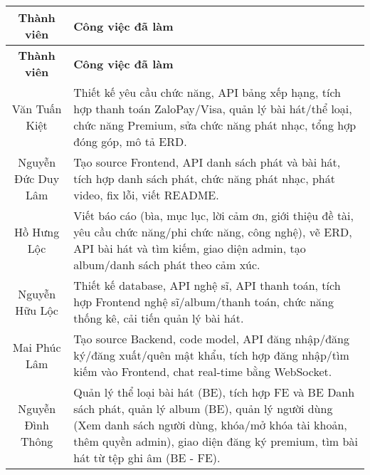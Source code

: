 \begin{longtable}{|c|p{12cm}|}
    \hline
    \textbf{Thành viên} & \textbf{Công việc đã làm} \\
    \hline
    \endfirsthead
    \hline
    \textbf{Thành viên} & \textbf{Công việc đã làm} \\
    \hline
    \endhead
    \hline
    \endfoot

    Văn Tuấn Kiệt & Thiết kế yêu cầu chức năng, API bảng xếp hạng, tích hợp thanh toán ZaloPay/Visa, quản lý bài hát/thể loại, chức năng Premium, sửa chức năng phát nhạc, tổng hợp đóng góp, mô tả ERD. \\
    \hline
    Nguyễn Đức Duy Lâm & Tạo source Frontend, API danh sách phát và bài hát, tích hợp danh sách phát, chức năng phát nhạc, phát video, fix lỗi, viết README. \\
    \hline
    Hồ Hưng Lộc & Viết báo cáo (bìa, mục lục, lời cảm ơn, giới thiệu đề tài, yêu cầu chức năng/phi chức năng, công nghệ), vẽ ERD, API bài hát và tìm kiếm, giao diện admin, tạo album/danh sách phát theo cảm xúc. \\
    \hline
    Nguyễn Hữu Lộc & Thiết kế database, API nghệ sĩ, API thanh toán, tích hợp Frontend nghệ sĩ/album/thanh toán, chức năng thống kê, cải tiến quản lý bài hát. \\
    \hline
    Mai Phúc Lâm & Tạo source Backend, code model, API đăng nhập/đăng ký/đăng xuất/quên mật khẩu, tích hợp đăng nhập/tìm kiếm vào Frontend, chat real-time bằng WebSocket. \\
    \hline
    Nguyễn Đình Thông & Quản lý thể loại bài hát (BE), tích hợp FE và BE Danh sách phát, quản lý album (BE), quản lý người dùng (Xem danh sách người dùng, khóa/mở khóa tài khoản, thêm quyền admin), giao diện đăng ký premium, tìm bài hát từ tệp ghi âm (BE - FE). \\
    \hline
\end{longtable}
